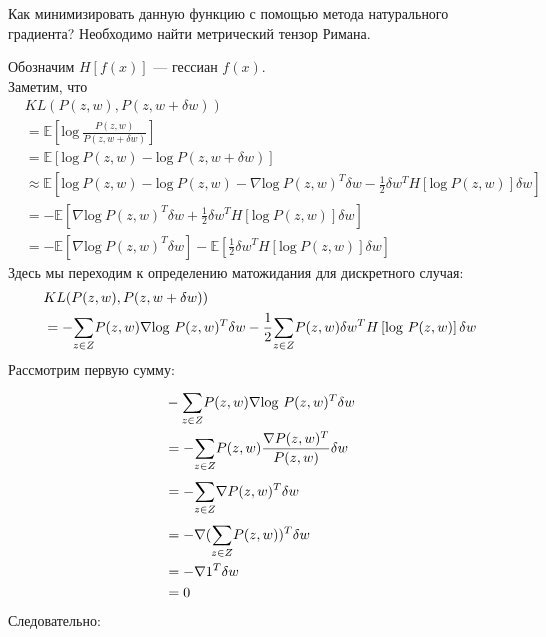 \documentclass[a4paper,12pt]{article}
\begin{document}
Как минимизировать данную функцию с помощью метода натурального градиента? Необходимо найти метрический тензор Римана.

Обозначим $H\left[f(x)\right]$ --- гессиан $f(x)$. \\
Заметим, что
$$
\begin{aligned}
    & KL(P(z, w), P(z, w + \delta w)) \\
    & = \mathbb{E} \left[ \mbox{log} ~ \frac{P(z, w)}{P(z, w + \delta w)} \right] \\
    & = \mathbb{E} \left[ \mbox{log} ~ P(z, w) - \mbox{log} ~ P(z, w + \delta w) \right] \\
    & \approx \mathbb{E} \left[ \mbox{log} ~ P(z, w) - \mbox{log} ~ P(z, w) - \nabla \mbox{log} ~ P(z, w)^T \delta w - \frac{1}{2} \delta w^T H\left[\mbox{log} ~ P(z, w)\right] \delta w \right] \\
    & = \mathbb{-E} \left[ \nabla \mbox{log} ~ P(z, w)^T \delta w + \frac{1}{2} \delta w^T H\left[\mbox{log} ~ P(z, w)\right] \delta w \right] \\
    & = \mathbb{-E} \left[ \nabla \mbox{log} ~ P(z, w)^T \delta w \right] - \mathbb{E} \left[ \frac{1}{2} \delta w^T H\left[\mbox{log} ~ P(z, w)\right] \delta w \right]
\end{aligned}
$$
Здесь мы переходим к определению матожидания для дискретного случая:
$$
\begin{aligned}
    & KL(P(z, w), P(z, w + \delta w)) \\
    & = -\overset{}{\underset{z \in Z}{\sum}}{P}(z, w) \nabla \mbox{log} ~ P(z, w)^T \delta w -\frac{1}{2} \overset{}{\underset{z \in Z}{\sum}}{P}(z, w) \delta w^T H\left[\mbox{log} ~ P(z, w) \right] \delta w \\
\end{aligned}
$$
Рассмотрим первую сумму:
$$
\begin{aligned}
    & -\overset{}{\underset{z \in Z}{\sum}}{P}(z, w) \nabla \mbox{log} ~ P(z, w)^T \delta w \\
    & = -\overset{}{\underset{z \in Z}{\sum}}{P}(z, w) \frac{\nabla P(z, w)^T}{P(z, w)} \delta w \\
    & = -\overset{}{\underset{z \in Z}{\sum}}{\nabla} P(z, w)^T \delta w \\
    & = -\nabla (\overset{}{\underset{z \in Z}{\sum}}{P}(z, w))^T \delta w \\
    & = -\nabla 1^T \delta w \\
    & = 0
\end{aligned}
$$
Следовательно: 
\end{document}
